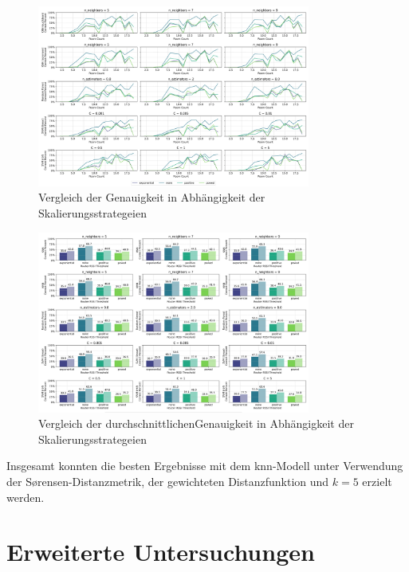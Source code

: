\begin{figure}[H]
    \centering
    \includegraphics[width=0.8\textwidth]{images/11_value_scaling_strategy_02.png}
    \caption{Vergleich der Genauigkeit in Abhängigkeit der Skalierungsstrategeien}
    \label{fig:7_value_scaling_strategy_02}
\end{figure}

\begin{figure}[H]
    \centering
    \includegraphics[width=0.8\textwidth]{images/11_value_scaling_strategy_03.png}
    \caption{Vergleich der durchschnittlichenGenauigkeit in Abhängigkeit der Skalierungsstrategeien}
    \label{fig:7_value_scaling_strategy_03}
\end{figure}

Insgesamt konnten die besten Ergebnisse mit dem \gls{knn}-Modell unter Verwendung der Sørensen-Distanzmetrik, der gewichteten Distanzfunktion und \( k  = 5 \) erzielt werden.

\section{Erweiterte Untersuchungen} \label{erweiterte_untersuchungen}

